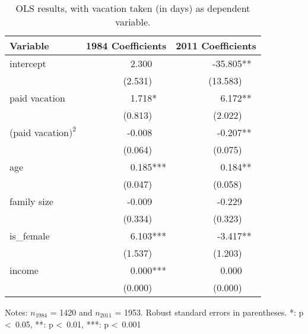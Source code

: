 \documentclass{article}
\begin{document}
    \setlength{\extrarowheight}{3pt}
    \begin{table}[h]
    \centering
    \hspace*{-1.5cm}
    \begin{tabular}{l|r|r}
    Variable            &             1984 Coefficients &              2011 Coefficients \\ \hline \hline
    intercept           &   2.300\textcolor{white}{***} &  -35.805**\textcolor{white}{*} \\
                        & (2.531)\textcolor{white}{***} & (13.583)\textcolor{white}{***} \\ \hline
    paid vacation       &   1.718*\textcolor{white}{**} &    6.172**\textcolor{white}{*} \\
                        & (0.813)\textcolor{white}{***} &  (2.022)\textcolor{white}{***} \\ \hline
    (paid vacation$)^2$ &  -0.008\textcolor{white}{***} &   -0.207**\textcolor{white}{*} \\
                        & (0.064)\textcolor{white}{***} &  (0.075)\textcolor{white}{***} \\ \hline
    age                 &   0.185***\textcolor{white}{} &    0.184**\textcolor{white}{*} \\
                        & (0.047)\textcolor{white}{***} &  (0.058)\textcolor{white}{***} \\ \hline
    family size         &  -0.009\textcolor{white}{***} &   -0.229\textcolor{white}{***} \\
                        & (0.334)\textcolor{white}{***} &  (0.323)\textcolor{white}{***} \\ \hline
    is\_female          &   6.103***\textcolor{white}{} &   -3.417**\textcolor{white}{*} \\
                        & (1.537)\textcolor{white}{***} &  (1.203)\textcolor{white}{***} \\ \hline
    income              &   0.000***\textcolor{white}{} &    0.000\textcolor{white}{***} \\
                        & (0.000)\textcolor{white}{***} &  (0.000)\textcolor{white}{***}
    \end{tabular}
    \hspace*{-1.5cm}
    \caption{OLS results, with vacation taken (in days) as dependent variable.}
    \label{ols}
      Notes: $n_{1984}$ = 1420 and $n_{2011}$ = 1953.
      Robust standard errors in parentheses.
      *: p \textless\ 0.05, **: p \textless\ 0.01, ***: p \textless\ 0.001
    \end{table}
\end{document}
